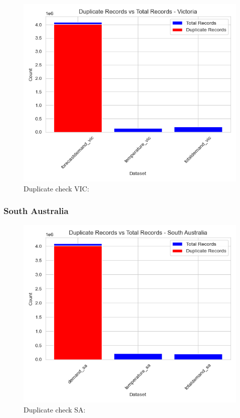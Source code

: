 \documentclass[mstat,12pt]{unswthesis}
\begin{document}
\begin{figure}
\centering
\includegraphics{img/duplicate_check_vic.png}
\caption{Duplicate check VIC:}
\end{figure}

\subsubsection{South Australia}\label{south-australia}

\begin{figure}
\centering
\includegraphics{img/duplicate_check_SA.png}
\caption{Duplicate check SA:}
\end{figure}
\end{document}
